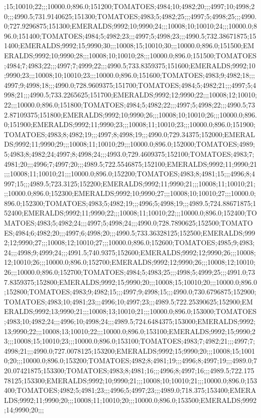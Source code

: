 ;15;10010;22;;;10000.0;896.0;151200;TOMATOES;4984;10;4982;20;;;4997;10;4998;20;;;4990.5;731.9140625;151300;TOMATOES;4983;5;4982;25;;;4997;5;4998;25;;;4990.0;727.9296875;151300;EMERALDS;9992;10;9990;24;;;10008;10;10010;24;;;10000.0;896.0;151400;TOMATOES;4984;5;4982;23;;;4997;5;4998;23;;;4990.5;732.38671875;151400;EMERALDS;9992;15;9990;30;;;10008;15;10010;30;;;10000.0;896.0;151500;EMERALDS;9992;10;9990;28;;;10008;10;10010;28;;;10000.0;896.0;151500;TOMATOES;4984;7;4983;22;;;4997;7;4999;22;;;4990.5;733.8359375;151600;EMERALDS;9992;10;9990;23;;;10008;10;10010;23;;;10000.0;896.0;151600;TOMATOES;4983;9;4982;18;;;4997;9;4998;18;;;4990.0;728.9609375;151700;TOMATOES;4984;5;4982;21;;;4997;5;4998;21;;;4990.5;733.2265625;151700;EMERALDS;9992;12;9990;22;;;10008;12;10010;22;;;10000.0;896.0;151800;TOMATOES;4984;5;4982;22;;;4997;5;4998;22;;;4990.5;732.87109375;151800;EMERALDS;9992;10;9990;26;;;10008;10;10010;26;;;10000.0;896.0;151900;EMERALDS;9992;11;9990;23;;;10008;11;10010;23;;;10000.0;896.0;151900;TOMATOES;4983;8;4982;19;;;4997;8;4998;19;;;4990.0;729.34375;152000;EMERALDS;9992;11;9990;29;;;10008;11;10010;29;;;10000.0;896.0;152000;TOMATOES;4989;5;4983;8;4982;24;4997;8;4998;24;;;4993.0;729.4609375;152100;TOMATOES;4983;7;4981;20;;;4996;7;4997;20;;;4989.5;722.5546875;152100;EMERALDS;9992;11;9990;21;;;10008;11;10010;21;;;10000.0;896.0;152200;TOMATOES;4983;8;4981;15;;;4996;8;4997;15;;;4989.5;723.3125;152200;EMERALDS;9992;11;9990;21;;;10008;11;10010;21;;;10000.0;896.0;152300;EMERALDS;9992;10;9990;27;;;10008;10;10010;27;;;10000.0;896.0;152300;TOMATOES;4983;5;4982;19;;;4996;5;4998;19;;;4989.5;724.88671875;152400;EMERALDS;9992;11;9990;22;;;10008;11;10010;22;;;10000.0;896.0;152400;TOMATOES;4983;5;4982;24;;;4997;5;4998;24;;;4990.0;728.7890625;152500;TOMATOES;4984;6;4982;20;;;4997;6;4998;20;;;4990.5;733.36328125;152500;EMERALDS;9992;12;9990;27;;;10008;12;10010;27;;;10000.0;896.0;152600;TOMATOES;4985;9;4983;24;;;4998;9;4999;24;;;4991.5;740.9375;152600;EMERALDS;9992;12;9990;26;;;10008;12;10010;26;;;10000.0;896.0;152700;EMERALDS;9992;12;9990;26;;;10008;12;10010;26;;;10000.0;896.0;152700;TOMATOES;4984;5;4983;25;;;4998;5;4999;25;;;4991.0;737.8359375;152800;EMERALDS;9992;15;9990;20;;;10008;15;10010;20;;;10000.0;896.0;152800;TOMATOES;4983;9;4982;15;;;4997;9;4998;15;;;4990.0;730.6796875;152900;TOMATOES;4983;10;4981;23;;;4996;10;4997;23;;;4989.5;722.25390625;152900;EMERALDS;9992;13;9990;21;;;10008;13;10010;21;;;10000.0;896.0;153000;TOMATOES;4983;10;4982;24;;;4996;10;4998;24;;;4989.5;724.6484375;153000;EMERALDS;9992;13;9990;22;;;10008;13;10010;22;;;10000.0;896.0;153100;EMERALDS;9992;15;9990;23;;;10008;15;10010;23;;;10000.0;896.0;153100;TOMATOES;4983;7;4982;21;;;4997;7;4998;21;;;4990.0;727.0078125;153200;EMERALDS;9992;15;9990;20;;;10008;15;10010;20;;;10000.0;896.0;153200;TOMATOES;4982;8;4981;19;;;4996;8;4997;19;;;4989.0;720.07421875;153300;TOMATOES;4983;8;4981;16;;;4996;8;4997;16;;;4989.5;722.17578125;153300;EMERALDS;9992;10;9990;21;;;10008;10;10010;21;;;10000.0;896.0;153400;TOMATOES;4982;5;4981;23;;;4996;5;4997;23;;;4989.0;718.375;153400;EMERALDS;9992;11;9990;20;;;10008;11;10010;20;;;10000.0;896.0;153500;EMERALDS;9992;14;9990;20;;;